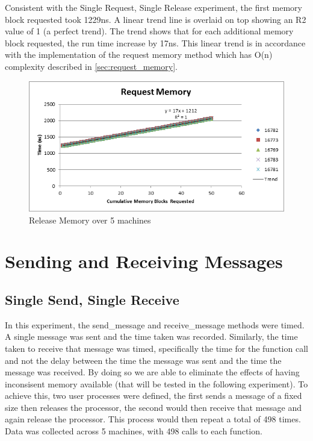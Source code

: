 \documentclass[12pt]{report}
\begin{document}
\par Consistent with the Single Request, Single Release experiment, the first memory block requested took 1229ns. A linear trend line is overlaid on top showing an R2 value of 1 (a perfect trend). The trend shows that for each additional memory block requested, the run time increase by 17ns. This linear trend is in accordance with the implementation of the request memory method which has O(n) complexity described in \ref{sec:request_memory}.

\begin{figure}[h!]
  \centering
    \includegraphics{RequestMemory.png}
  \caption{Release Memory over 5 machines}
\end{figure}

\section{Sending and Receiving Messages}
\subsection{Single Send, Single Receive}
\label{sec:single_send_single_receive}

In this experiment, the send\_message and receive\_message methods were timed. A single message was sent and the time taken was recorded. Similarly, the time taken to receive that message was timed, specifically the time for the function call and not the delay between the time the message was sent and the time the message was received. By doing so we are able to eliminate the effects of having inconsisent memory available (that will be tested in the following experiment). To achieve this, two user processes were defined, the first sends a message of a fixed size then releases the processor, the second would then receive that message and again release the processor. This process would then repeat a total of 498 times. Data was collected across 5 machines, with 498 calls to each function.
\end{document}
